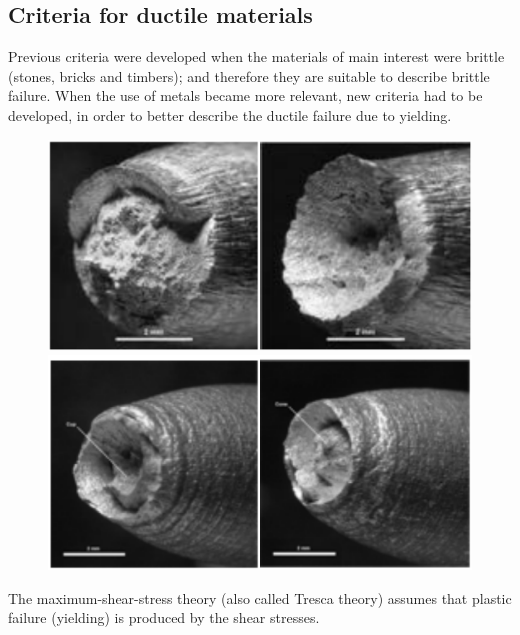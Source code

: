 \documentclass[class=report, crop=false, 12pt,a4paper]{standalone}
\begin{document}
\subsection{Criteria for ductile materials}
Previous criteria were developed when the materials of main interest were brittle (stones, bricks and timbers); and therefore they are suitable to describe brittle failure. When the use of metals became more relevant, new criteria had to be developed, in order to better describe the ductile failure due to yielding. 
\begin{figure}
  \begin{center}
    \begin{minipage}[b]{0.46\textwidth}
      \centering
      \includegraphics[width = \textwidth]{../img/diagram83.png}
      \caption{}
    \end{minipage}
    \begin{minipage}[b]{0.46\textwidth}
      \centering
      \includegraphics[width = \textwidth]{../img/diagram84.png}
      \caption{}
    \end{minipage}
  \end{center}
\end{figure}
The maximum-shear-stress theory (also called Tresca theory) assumes that plastic failure (yielding) is produced by the shear stresses. 
\end{document}
